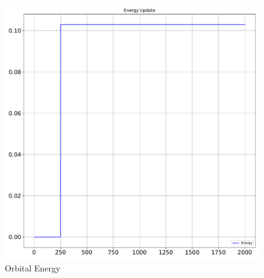 \begin{figure}[htbp]\centerline{\includegraphics[height=0.9\textwidth, keepaspectratio]{AutoTeX/EnergyUpdate}}\caption{Orbital Energy}\label{fig:EnergyUpdate}\end{figure}